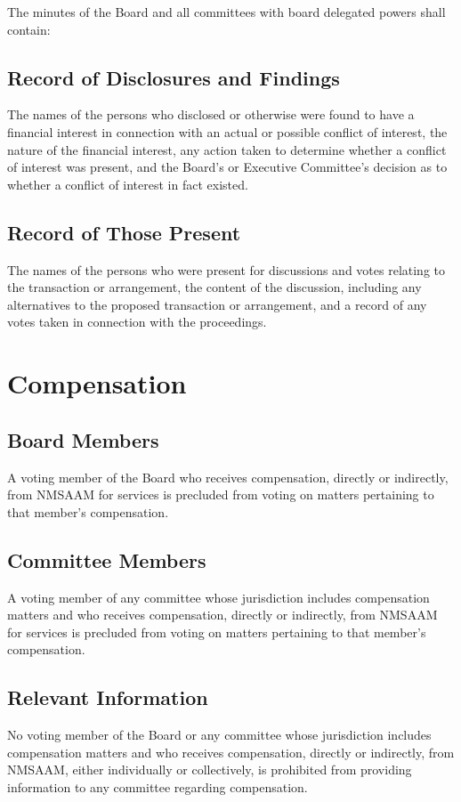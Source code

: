 \documentclass[letterpaper,12pt]{article}
\begin{document}
The minutes of the Board and all committees with board delegated
powers shall contain:
\subsection{Record of Disclosures and Findings}
\label{sec:org8364e95}
The names of the persons who disclosed or otherwise were found to
have a financial interest in connection with an actual or
possible conflict of interest, the nature of the financial
interest, any action taken to determine whether a conflict of
interest was present, and the Board's or Executive Committee's
decision as to whether a conflict of interest in fact existed.
\subsection{Record of Those Present}
\label{sec:org39c7225}
The names of the persons who were present for discussions and votes
relating to the transaction or arrangement, the content of the
discussion, including any alternatives to the proposed transaction
or arrangement, and a record of any votes taken in connection with
the proceedings.

\section{Compensation}
\label{sec:orged3ceab}

\subsection{Board Members}
\label{sec:orga5539f9}
A voting member of the Board who receives compensation, directly
or indirectly, from NMSAAM for services is precluded from voting
on matters pertaining to that member's compensation.

\subsection{Committee Members}
\label{sec:orgda447a1}
A voting member of any committee whose jurisdiction includes
compensation matters and who receives compensation, directly or
indirectly, from NMSAAM for services is precluded from voting on
matters pertaining to that member's compensation.
\subsection{Relevant Information}
\label{sec:orgef750b6}
No voting member of the Board or any committee whose jurisdiction
includes compensation matters and who receives compensation,
directly or indirectly, from NMSAAM, either individually or
collectively, is prohibited from providing information to any
committee regarding compensation.
\end{document}
